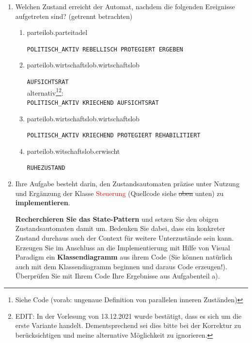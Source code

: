 \documentclass{article}
\begin{document}
    \begin{enumerate}[label=\alph*.]
        \item Welchen Zustand erreicht der Automat, nachdem die folgenden Ereignisse aufgetreten sind? (getrennt betrachten)
            \begin{enumerate}[label=\roman*.]
                \item parteilob.parteitadel

                    \texttt{POLITISCH\_AKTIV REBELLISCH PROTEGIERT ERGEBEN}
                
                \item parteilob.wirtschaftslob.wirtschaftslob

                    \texttt{AUFSICHTSRAT}\\
                    alternativ\footnote{Siehe Code (vorab: ungenaue Definition von parallelen inneren Zuständen)}\footnote{EDIT: In der Vorlesung von 13.12.2021 wurde bestätigt, dass es sich um die erste Variante handelt. Dementsprechend sei dies bitte bei der Korrektur zu berücksichtigen und meine alternative Möglichkeit zu ignorieren.}:\\
                    \texttt{POLITISCH\_AKTIV KRIECHEND AUFSICHTSRAT}
                
                \item parteilob.wirtschaftslob.wirtschaftslob

                    \texttt{POLITISCH\_AKTIV KRIECHEND PROTEGIERT REHABILITIERT}
                
                \item parteilob.witschaftslob.erwischt

                    \texttt{RUHEZUSTAND}
            \end{enumerate}

        \newpage
        \item Ihre Aufgabe besteht darin, den Zustandsautomaten präzise unter Nutzung und Ergänzung der Klasse \textcolor{red}{Steuerung} (Quellcode siehe \sout{oben} unten) zu \textbf{implementieren}.

            \textbf{Recherchieren Sie das State-Pattern} und setzen Sie den obigen Zustandsautomaten damit um.
            Bedenken Sie dabei, dass ein konkreter Zustand durchaus auch der Context für weitere Unterzustände sein kann.
            Erzeugen Sie im Anschluss an die Implementierung mit Hilfe von Visual Paradigm ein \textbf{Klassendiagramm} aus ihrem Code (Sie können natürlich auch mit dem Klassendiagramm beginnen und daraus Code erzeugen!).
            Überprüfen Sie mit Ihrem Code Ihre Ergebnisse aus Aufgabenteil a).
            

\end{enumerate}
\end{document}
